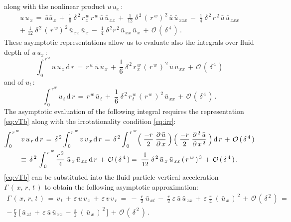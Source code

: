 \documentclass[alpha-refs, 12pt]{wiley-article}
\renewcommand{\O}{\mathcal{O}}
\newcommand{\eps}{\varepsilon}
\begin{document}
along with the nonlinear product $u\,u_x\,$:
\begin{multline*}
  u\,u_{\,x}\,=\,\bar{u}\bar{u}_{\,x}\,+\;\frac{1}{6}\;\delta^{\,2}\,r^{\,w}_{\,x}\,r^{\,w}\,\bar{u}\,\bar{u}_{\,xx}\,+\;\frac{1}{12}\;\delta^{\,2}\,(\,r^{\,w})^{\,2}\,\bar{u}\,\bar{u}_{\,xxx}\,-\;\frac{1}{4}\;\delta^{\,2}\,r^{\,2}\,\bar{u}\,\bar{u}_{\,xxx} \\
  +\;\frac{1}{12}\;\delta^{\,2}\,(\,r^{\,w})^{\,2}\,\bar{u}_{\,xx}\,\bar{u}_{\,x}\,
  -\;\frac{1}{4}\;\delta^{\,2}r^{\,2}\,\bar{u}_{\,xx}\,\bar{u}_{\,x}\,+\,\O\,(\,\delta^{\,4}\,)\,.
\end{multline*}
These asymptotic representations allow us to evaluate also the integrals over fluid depth of $u\,u_x\,$:
\begin{equation*}
  \int_{\,0}^{\,r^{\,w}}u\,u_{\,x}\,\mathrm{d}\,r\, = \,r^{\,w}\,\bar{u}\,\bar{u}_{\,x}\, +\,\frac{1}{6}\;\delta^{\,2}\,r^{\,w}_{\,x}\,(\,r^{\,w}\,)^{\,2}\,\bar{u}\,\bar{u}_{\,xx}\,+\,\O\,(\,\delta^{\,4}\,)
\end{equation*}
and of $u_t\,$:
\begin{equation*}
  \int_{\,0}^{\,r^{\,w}}u_{\,t}\,\mathrm{d}\,r\,=\,r^{\,w}\,\bar{u}_{\,t}\,+\;\frac{1}{6}\;\delta^{\,2}\,r^{\,w}_{\,t}\,(\,r^{\,w}\,)^{\,2}\,\bar{u}_{\,xx}\,+\,\O\,(\,\delta^{\,4}\,)\,.
\end{equation*}
The asymptotic evaluation of the following integral requires the representation \eqref{eq:vTb} along with the irrotationality condition \eqref{eq:irr}:
\begin{multline*}
  \int_{\,0}^{\,r^{\,w}}v\,u_{\,r}\,\mathrm{d}\,r\, = \,\delta^{\,2}\int_{\,0}^{\,r^{\,w}}v\,v_{\,x}\,\mathrm{d}\,r\, = \, \delta^{\,2} \int_{\,0}^{\,r^{\,w}}\Bigl(\;\frac{-r}{2}\;\frac{\partial \,\bar{u}}{\partial\, x}\;\Bigr)\,\Bigl(\;\frac{-r}{2}\;\frac{\partial^{\,2}\,\bar{u}}{\partial\, x^{\,2}}\; \Bigr)\, \mathrm{d}\,r\, + \,\O\,(\,\delta^{\,4}\,) \\
  \equiv \,\delta^{\,2}\, \int_{\,0}^{\,r^{\,w}}\frac{r^{\,2}}{4}\; \bar{u}_{\,x}\, \bar{u}_{\,xx}\, \mathrm{d}\,r\, + \,\O\,(\,\delta^{\,4}\,) = \;\frac{1}{12}\;\delta^{\,2}\, \bar{u}_{\,x}\, \bar{u}_{\,xx}\,(\,r^{\,w}\,)^{\,3}\, + \,\O\,(\,\delta^{\,4}\,)\,.
\end{multline*}
\cref{eq:vTb} can be substituted into the fluid particle vertical acceleration $\Gamma\,(\,x,\,r,\,t\,)$ to obtain the following asymptotic approximation:
\begin{multline*}
  \Gamma\,(\,x,\,r,\,t\,)\,=\,v_{\,t}\,+\,\eps\,u\,v_{\,x}\,+\,\eps\,v\,v_{\,r}\ =\ -\;\frac{r}{2}\;\bar{u}_{\,xt}\,-\;\frac{r}{2}\;\eps\,\bar{u}\,\bar{u}_{\,xx}\,+\,\eps\; \frac{r}{4}\;(\,\bar{u}_{\,x}\,)^{\,2}\, +\, \O\,(\,\delta^{\,2}\,)\, =\\ 
  -\,\frac{r}{2}\;\bigl[\,\bar{u}_{\,xt}\,+\,\eps\,\bar{u}\,\bar{u}_{\,xx}\,-\,\frac{\eps}{2}\;(\,\bar{u}_{\,x}\,)^{\,2}\,\bigr]\, + \,\O\,(\,\delta^{\,2}\,)\,.
\end{multline*}
\end{document}
